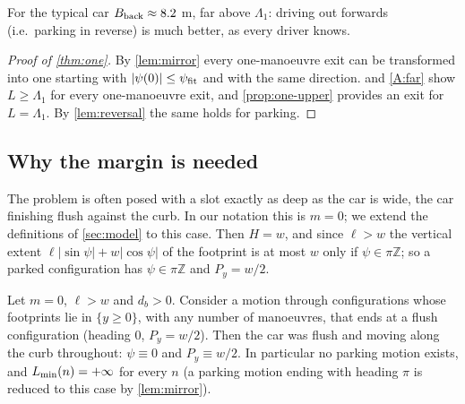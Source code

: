 For the typical car $B_{\rm back}\approx8.2$ m, far above $\Lambda_1$: driving out forwards (i.e.\ parking in reverse) is much better, as every driver knows.

\begin{proof}[Proof of \cref{thm:one}]
By \cref{lem:mirror} every one-manoeuvre exit can be transformed into one starting with $|\psi(0)|\le\psi_{\rm fit}$ and with the same direction.
 and \ref{A:far} show $L\ge\Lambda_1$ for every one-manoeuvre exit, and \cref{prop:one-upper} provides an exit for $L=\Lambda_1$.
By \cref{lem:reversal} the same holds for parking.
\end{proof}

\subsection{Why the margin is needed}\label{sec:flush}

The problem is often posed with a slot exactly as deep as the car is wide, the car finishing flush against the curb.
In our notation this is $m=0$; we extend the definitions of \cref{sec:model} to this case.
Then $H=w$, and since $\ell>w$ the vertical extent $\ell|\sin\psi|+w|\cos\psi|$ of the footprint is at most $w$ only if $\psi\in\pi\mathbb Z$; so a parked configuration has $\psi\in\pi\mathbb Z$ and $P_y=w/2$.

\begin{proposition}\label{prop:flush}
Let $m=0$, $\ell>w$ and $d_b>0$.
Consider a motion through configurations whose footprints lie in $\{y\ge0\}$, with any number of manoeuvres, that ends at a flush configuration (heading $0$, $P_y=w/2$).
Then the car was flush and moving along the curb throughout: $\psi\equiv0$ and $P_y\equiv w/2$.
In particular no parking motion exists, and $L_{\min}(n)=+\infty$ for every $n$ (a parking motion ending with heading $\pi$ is reduced to this case by \cref{lem:mirror}).
\end{proposition}

